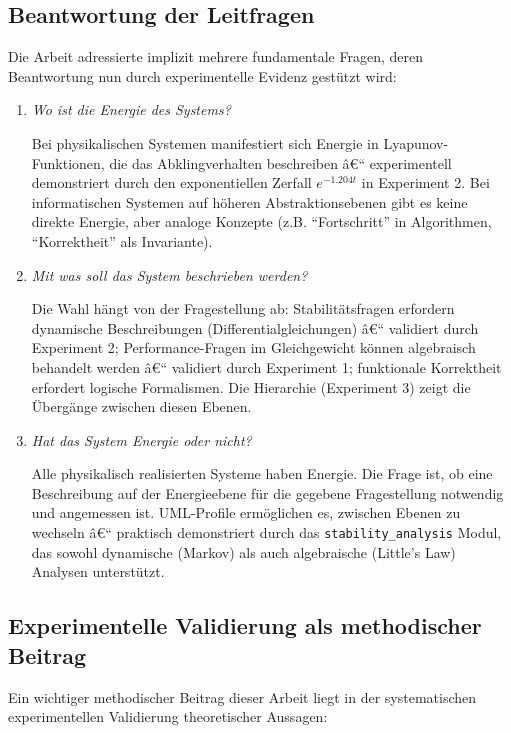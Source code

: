 ﻿\documentclass[a4paper,12pt]{scrreprt}
\theoremstyle{definition}
\begin{document}
\subsection{Beantwortung der Leitfragen}

Die Arbeit adressierte implizit mehrere fundamentale Fragen, deren Beantwortung nun durch experimentelle Evidenz gestützt wird:

\begin{enumerate}
	\item[-] \textit{Wo ist die Energie des Systems?} 
	
	Bei physikalischen Systemen manifestiert sich Energie in Lyapunov-Funktionen, die das Abklingverhalten beschreiben â€“ experimentell demonstriert durch den exponentiellen Zerfall $e^{-1.204t}$ in Experiment 2. Bei informatischen Systemen auf höheren Abstraktionsebenen gibt es keine direkte Energie, aber analoge Konzepte (z.B. ``Fortschritt'' in Algorithmen, ``Korrektheit'' als Invariante).
	
	\item[-] \textit{Mit was soll das System beschrieben werden?}
	
	Die Wahl hängt von der Fragestellung ab: Stabilitätsfragen erfordern dynamische Beschreibungen (Differentialgleichungen) â€“ validiert durch Experiment 2; Performance-Fragen im Gleichgewicht können algebraisch behandelt werden â€“ validiert durch Experiment 1; funktionale Korrektheit erfordert logische Formalismen. Die Hierarchie (Experiment 3) zeigt die Übergänge zwischen diesen Ebenen.
	
	\item[-] \textit{Hat das System Energie oder nicht?}
	
	Alle physikalisch realisierten Systeme haben Energie. Die Frage ist, ob eine Beschreibung auf der Energieebene für die gegebene Fragestellung notwendig und angemessen ist. UML-Profile ermöglichen es, zwischen Ebenen zu wechseln â€“ praktisch demonstriert durch das \texttt{stability\_analysis} Modul, das sowohl dynamische (Markov) als auch algebraische (Little's Law) Analysen unterstützt.
\end{enumerate}

\subsection{Experimentelle Validierung als methodischer Beitrag}

Ein wichtiger methodischer Beitrag dieser Arbeit liegt in der systematischen experimentellen Validierung theoretischer Aussagen:
\end{document}
